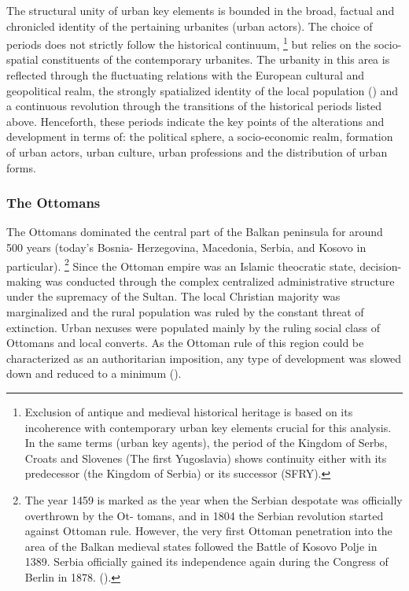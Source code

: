 \documentclass[11pt]{report}
\begin{document}
{{{{The structural unity of urban key elements is bounded in the broad, factual and chronicled identity of the pertaining urbanites (urban actors).
The choice of periods does not strictly follow the historical continuum, \footnote{Exclusion of antique and medieval historical heritage is based on its incoherence with contemporary urban key elements crucial for this analysis. In the same terms (urban key agents), the period of the Kingdom of Serbs, Croats and Slovenes (The first Yugoslavia) shows continuity either with its predecessor (the Kingdom of Serbia) or its successor (SFRY).}
but relies on the socio-spatial constituents of the contemporary urbanites. The urbanity in this area is reflected through the fluctuating relations with the European cultural and geopolitical realm, the strongly spatialized identity of the local population (\href{Savic}{\citealt{savic_where_2014}}) and a continuous revolution   through the transitions of the historical periods listed above. Henceforth, these periods indicate the key points of the alterations and development in terms of: the political sphere, a socio-economic realm, formation of urban actors, urban culture, urban professions and the distribution of urban forms.

\subsubsection{The Ottomans}

The Ottomans  dominated  the  central  part  of  the  Balkan  peninsula for around 500 years  (today’s  Bosnia- Herzegovina, Macedonia, Serbia, and Kosovo in particular).
\footnote{The year 1459 is marked as the year when the  Serbian despotate was officially overthrown by the Ot-
tomans, and in 1804 the Serbian revolution started against Ottoman rule. However, the very first Ottoman penetration into the area of the Balkan medieval states followed the Battle of Kosovo Polje in 1389. Serbia officially gained its independence again during the Congress of Berlin in 1878. (\href{Corovic}{\citealt{corovic_istorija_1997}}).}
Since the Ottoman empire was an Islamic theocratic state, decision-making was conducted through the complex centralized administrative structure under the supremacy of the Sultan. The local Christian majority was marginalized and the rural population was ruled by the constant threat of extinction. Urban nexuses were populated mainly by the ruling social class of Ottomans and local converts. As the Ottoman rule of this region could be characterized as an authoritarian imposition, any type of development was slowed down and reduced to a minimum (\href{Nedovic}{\citealt{nedovicbudic_waves_2006}}).
\\

}}}}
\end{document}

